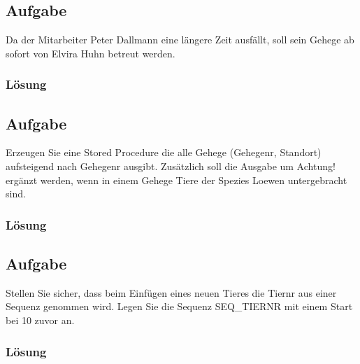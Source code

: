 \subsection{Aufgabe}
Da der Mitarbeiter Peter Dallmann eine längere Zeit ausfällt, soll sein Gehege ab sofort von Elvira Huhn betreut werden.

\label{subsubsec:uebung_01.aufgabe_6.loesung}
\subsubsection*{Lösung}


\label{subsec:uebung_01.aufgabe_07}
\subsection{Aufgabe}
Erzeugen Sie eine Stored Procedure die alle Gehege (Gehegenr, Standort) aufsteigend nach Gehegenr ausgibt. Zusätzlich soll die Ausgabe um Achtung! ergänzt werden, wenn in einem Gehege Tiere der Spezies Loewen untergebracht sind.

\label{subsubsec:uebung_01.aufgabe_7.loesung}
\subsubsection*{Lösung}


\label{subsec:uebung_01.aufgabe_08}
\subsection{Aufgabe}
Stellen Sie sicher, dass beim Einfügen eines neuen Tieres die Tiernr aus einer Sequenz genommen wird. Legen Sie die Sequenz SEQ\_TIERNR mit einem Start bei 10 zuvor an.

\label{subsubsec:uebung_01.aufgabe_8.loesung}
\subsubsection*{Lösung}


